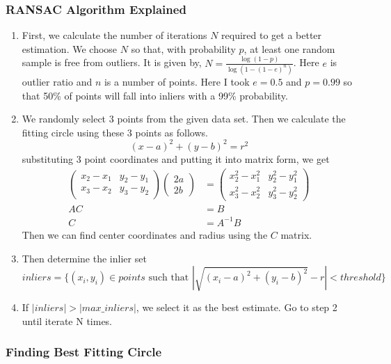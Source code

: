 \documentclass[a4paper]{article}
\begin{document}
\subsubsection*{RANSAC Algorithm Explained}
\begin{enumerate}
  \item First, we calculate the number of iterations $N$ required to get a better estimation. We choose $N$ 
  so that, with probability $p$, at least one random sample is free from outliers.
  It is given by, $N=\frac{\log{(1-p)}}{\log{(1-(1-e)^n)}}$. Here $e$ is outlier
  ratio and $n$ is a number of points. Here I took $e=0.5$ and $p=0.99$ so 
  that 50\% of points will fall into inliers with a 99\% probability.
  \item We randomly select 3 points from the given data set. Then we calculate the fitting
   circle using these 3 points as follows.
   $$(x-a)^2+(y-b)^2=r^2$$substituting 3 point coordinates and putting it into matrix form, we get
   \begin{align*}
     \begin{pmatrix}
       x_2-x_1 & y_2-y_1\\
       x_3-x_2 & y_3-y_2
     \end{pmatrix}
     \begin{pmatrix}
       2a\\
       2b
     \end{pmatrix}&=
     \begin{pmatrix}
      x_2^2-x_1^2 & y_2^2-y_1^2\\
      x_3^2-x_2^2 & y_3^2-y_2^2
    \end{pmatrix}\\
    AC&=B\\
    C&=A^{-1}B
   \end{align*}
   Then we can find center coordinates and radius using the $C$ matrix.
   \item Then determine the inlier set 
   $$inliers=\{(x_i,y_i)\in points \text{ such that }|\sqrt{(x_i-a)^2+(y_i-b)^2}-r|<threshold\}$$
   \item If $|inliers|>|max\_inliers|$, we select it as the best estimate. Go to step 2
   until iterate N times.
  \end{enumerate}

  \subsubsection*{Finding Best Fitting Circle}
\end{document}
